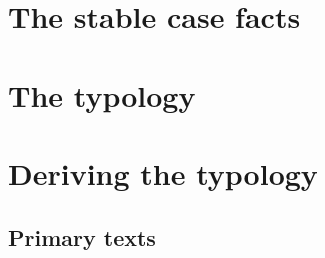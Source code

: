\documentclass[11pt,hidelinks]{memoir}
\begin{document}
\mainmatter
\setcounter{secnumdepth}{4}


%
\part{The stable case facts}\label{part:case-facts}



\part{The typology}\label{part:variation}



\part{Deriving the typology}
\begingroup
\let\clearpage\relax





\endgroup



\backmatter

\clearpage
\chapter*{Primary texts}
\begingroup
  \setlength{\LTleft}{-\tabcolsep}
\printacronyms[include=texts, heading=none]
\endgroup
{}

\newrefcontext[sorting=nyt]
\printbibliography

\end{document}

